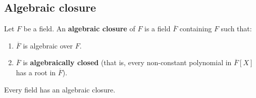 \subsection{Algebraic closure}

\begin{definition} 
Let $F$ be a field. An \textbf{algebraic closure} of $F$ is a field
$\overline{F}$ containing $F$ such that:
\begin{enumerate}[\textbf{AC} 1]
\item $\overline{F} $ is algebraic over $F$.
\item $\overline{F}$ is \textbf{algebraically closed} (that is, every
non-constant polynomial in $\overline{F}[X]$ has a root in $\overline{F}$).
\end{enumerate}
\end{definition} 

\begin{theorem}
Every field has an algebraic closure.
\end{theorem}

